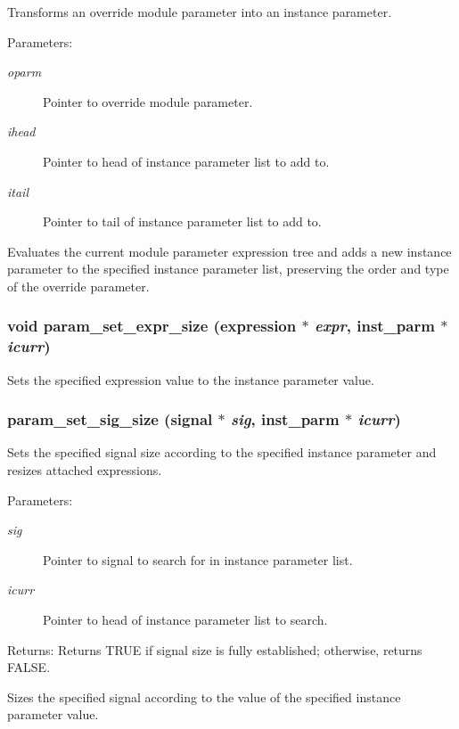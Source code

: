 Transforms an override module parameter into an instance parameter.

\begin{Desc}
\item[Parameters:]
\begin{description}
\item[{\em oparm}]Pointer to override module parameter. \item[{\em ihead}]Pointer to head of instance parameter list to add to. \item[{\em itail}]Pointer to tail of instance parameter list to add to.\end{description}
\end{Desc}
Evaluates the current module parameter expression tree and adds a new instance parameter to the specified instance parameter list, preserving the order and type of the override parameter. 
\subsubsection{\setlength{\rightskip}{0pt plus 5cm}void param\_\-set\_\-expr\_\-size ({\bf expression} $\ast$ {\em expr}, {\bf inst\_\-parm} $\ast$ {\em icurr})}\label{param_8h_a7}


Sets the specified expression value to the instance parameter value.

\subsubsection{ param\_\-set\_\-sig\_\-size ({\bf signal} $\ast$ {\em sig}, {\bf inst\_\-parm} $\ast$ {\em icurr})}\label{param_8h_a8}


Sets the specified signal size according to the specified instance parameter and resizes attached expressions.

\begin{Desc}
\item[Parameters:]
\begin{description}
\item[{\em sig}]Pointer to signal to search for in instance parameter list. \item[{\em icurr}]Pointer to head of instance parameter list to search.\end{description}
\end{Desc}
\begin{Desc}
\item[Returns:]Returns TRUE if signal size is fully established; otherwise, returns FALSE.\end{Desc}
Sizes the specified signal according to the value of the specified instance parameter value. 